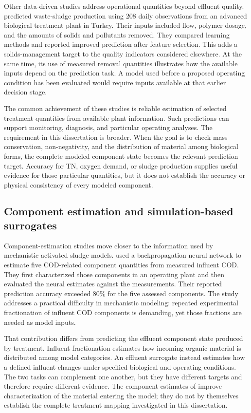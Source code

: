 Other data-driven studies address operational quantities beyond effluent quality. \citet{Ekinci2023} predicted waste-sludge production using 208 daily observations from an advanced biological treatment plant in Turkey. Their inputs included flow, polymer dosage, and the amounts of solids and pollutants removed. They compared learning methods and reported improved prediction after feature selection. This adds a solids-management target to the quality indicators considered elsewhere. At the same time, its use of measured removal quantities illustrates how the available inputs depend on the prediction task. A model used before a proposed operating condition has been evaluated would require inputs available at that earlier decision stage.

The common achievement of these studies is reliable estimation of selected treatment quantities from available plant information. Such predictions can support monitoring, diagnosis, and particular operating analyses. The requirement in this dissertation is broader. When the goal is to check mass conservation, non-negativity, and the distribution of material among biological forms, the complete modeled component state becomes the relevant prediction target. Accuracy for TN, oxygen demand, or sludge production supplies useful evidence for those particular quantities, but it does not establish the accuracy or physical consistency of every modeled component.

\subsection{Component estimation and simulation-based surrogates}

Component-estimation studies move closer to the information used by mechanistic activated sludge models. \citet{Wang2024} used a backpropagation neural network to estimate five COD-related component quantities from measured influent COD. They first characterized those components in an operating plant and then evaluated the neural estimates against the measurements. Their reported prediction accuracy exceeded 80\% for the five assessed components. The study addresses a practical difficulty in mechanistic modeling: repeated experimental fractionation of influent COD components is demanding, yet those fractions are needed as model inputs.

That contribution differs from predicting the effluent component state produced by treatment. Influent fractionation estimates how incoming organic material is distributed among model categories. An effluent surrogate instead estimates how a defined influent changes under specified biological and operating conditions. The two tasks can complement one another, but they have different targets and therefore require different evidence. The component estimates of \citet{Wang2024} improve characterization of the material entering the model; they do not by themselves establish the complete treatment mapping investigated in this dissertation.


